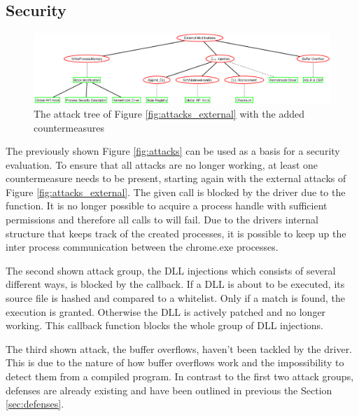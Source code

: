 \subsection{Security}
\begin{figure}[h]
\centering
\includegraphics[angle=90,scale=0.3]{sections/adtrees/ExternalModifications.png}
\caption{The attack tree of Figure \ref{fig:attacks_external} with the added countermeasures}
\label{fig:attacks_external_def}
\end{figure}
The previously shown Figure \ref{fig:attacks} can be used as a basis for a security evaluation. To ensure that all attacks are no longer working, at least one countermeasure needs to be present, starting again with the external attacks of Figure \ref{fig:attacks_external}. The given  call is blocked by the driver due to the  function. It is no longer possible to acquire a process handle with sufficient permissions and therefore all calls to  will fail. Due to the drivers internal structure that keeps track of the created processes, it is possible to keep up the inter process communication between the chrome.exe processes. 

The second shown attack group, the DLL injections which consists of several different ways, is blocked by the  callback. If a DLL is about to be executed, its source file is hashed and compared to a whitelist. Only if a match is found, the execution is granted. Otherwise the DLL is actively patched and no longer working. This callback function blocks the whole group of DLL injections.

The third shown attack, the buffer overflows, haven't been tackled by the driver. This is due to the nature of how buffer overflows work and the impossibility to detect them from a compiled program. In contrast to the first two attack groups, defenses are already existing and have been outlined in previous the Section \ref{sec:defenses}.

